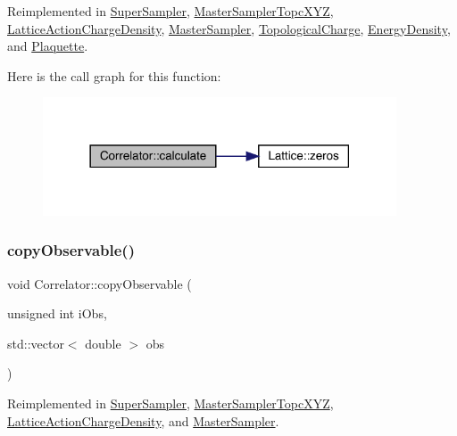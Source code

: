 Reimplemented in \mbox{\hyperlink{class_super_sampler_a7e1457583270077c4fbcb288ea9b954c}{Super\+Sampler}}, \mbox{\hyperlink{class_master_sampler_topc_x_y_z_a0ea80ad9935db791f00461b7dfd548b7}{Master\+Sampler\+Topc\+X\+YZ}}, \mbox{\hyperlink{class_lattice_action_charge_density_a3dddc75188042c645fbdd1c8b3e80c8a}{Lattice\+Action\+Charge\+Density}}, \mbox{\hyperlink{class_master_sampler_ad3cc7e36498dbf4a39238de3ac59ae8b}{Master\+Sampler}}, \mbox{\hyperlink{class_topological_charge_a8ed78c28c3484df04b1cb24187de2f5b}{Topological\+Charge}}, \mbox{\hyperlink{class_energy_density_ae8e5e29257104d881bcabeadc3b2c9e7}{Energy\+Density}}, and \mbox{\hyperlink{class_plaquette_a40cae6fd587c14836bdf61e69c615a00}{Plaquette}}.

Here is the call graph for this function\+:\nopagebreak
\begin{figure}[H]
\begin{center}
\leavevmode
\includegraphics[width=297pt]{class_correlator_ab33502ff305f891c5c2e6d66a26a0247_cgraph}
\end{center}
\end{figure}
\mbox{\label{class_correlator_ac780d8b180294ee4801ede6e6a13f7f4}} 
\subsubsection{\texorpdfstring{copyObservable()}{copyObservable()}}
{\footnotesize\ttfamily void Correlator\+::copy\+Observable (\begin{DoxyParamCaption}\item[{unsigned int}]{i\+Obs,  }\item[{std\+::vector$<$ double $>$}]{obs }\end{DoxyParamCaption})\hspace{0.3cm}{\ttfamily [virtual]}}



Reimplemented in \mbox{\hyperlink{class_super_sampler_a9f9155a519b2f60f029e92f641f54c9c}{Super\+Sampler}}, \mbox{\hyperlink{class_master_sampler_topc_x_y_z_a49ef8ccce4bf9473017bbb7c01f1404b}{Master\+Sampler\+Topc\+X\+YZ}}, \mbox{\hyperlink{class_lattice_action_charge_density_aef63c9fba819e838a87b509d53be248b}{Lattice\+Action\+Charge\+Density}}, and \mbox{\hyperlink{class_master_sampler_a893be9ba7dca98cb8d9d3cb30e42fcc3}{Master\+Sampler}}.

